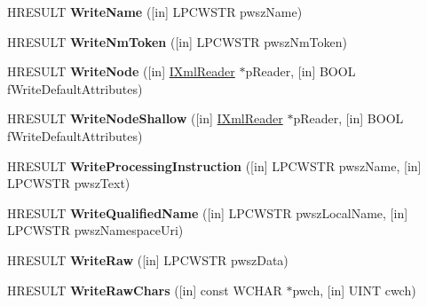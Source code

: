 \begin{DoxyCompactItemize}
H\+R\+E\+S\+U\+LT {\bfseries Write\+Name} (\mbox{[}in\mbox{]} L\+P\+C\+W\+S\+TR pwsz\+Name)
\item 
\mbox{\label{interface_i_xml_writer_aa7a276643af17b79cc831e0ab912676f}} 
H\+R\+E\+S\+U\+LT {\bfseries Write\+Nm\+Token} (\mbox{[}in\mbox{]} L\+P\+C\+W\+S\+TR pwsz\+Nm\+Token)
\item 
\mbox{\label{interface_i_xml_writer_a6d4436895aded56b40b0595b3632cfdc}} 
H\+R\+E\+S\+U\+LT {\bfseries Write\+Node} (\mbox{[}in\mbox{]} \hyperlink{interface_i_xml_reader}{I\+Xml\+Reader} $\ast$p\+Reader, \mbox{[}in\mbox{]} B\+O\+OL f\+Write\+Default\+Attributes)
\item 
\mbox{\label{interface_i_xml_writer_a48f83a2367276a5d9eb1c29839c70a88}} 
H\+R\+E\+S\+U\+LT {\bfseries Write\+Node\+Shallow} (\mbox{[}in\mbox{]} \hyperlink{interface_i_xml_reader}{I\+Xml\+Reader} $\ast$p\+Reader, \mbox{[}in\mbox{]} B\+O\+OL f\+Write\+Default\+Attributes)
\item 
\mbox{\label{interface_i_xml_writer_a76be2db7bc80d6e8e0243862b1801f42}} 
H\+R\+E\+S\+U\+LT {\bfseries Write\+Processing\+Instruction} (\mbox{[}in\mbox{]} L\+P\+C\+W\+S\+TR pwsz\+Name, \mbox{[}in\mbox{]} L\+P\+C\+W\+S\+TR pwsz\+Text)
\item 
\mbox{\label{interface_i_xml_writer_aaf260b98307e728cd71adea44f5c984a}} 
H\+R\+E\+S\+U\+LT {\bfseries Write\+Qualified\+Name} (\mbox{[}in\mbox{]} L\+P\+C\+W\+S\+TR pwsz\+Local\+Name, \mbox{[}in\mbox{]} L\+P\+C\+W\+S\+TR pwsz\+Namespace\+Uri)
\item 
\mbox{\label{interface_i_xml_writer_a016c0454530439d66a3a30b2a2783647}} 
H\+R\+E\+S\+U\+LT {\bfseries Write\+Raw} (\mbox{[}in\mbox{]} L\+P\+C\+W\+S\+TR pwsz\+Data)
\item 
\mbox{\label{interface_i_xml_writer_a72903dc355fc1a87a937fcae457446c8}} 
H\+R\+E\+S\+U\+LT {\bfseries Write\+Raw\+Chars} (\mbox{[}in\mbox{]} const W\+C\+H\+AR $\ast$pwch, \mbox{[}in\mbox{]} U\+I\+NT cwch)
\item 
\mbox{\label{interface_i_xml_writer_a193ade65066ee4a89f97414c24f4678b}} 

\end{DoxyCompactItemize}
